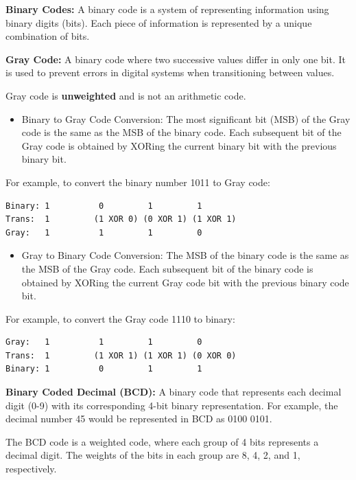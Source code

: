 \documentclass[11pt,a4paper]{article}
\providecommand{\tightlist}{\setlength{\itemsep}{1pt}\setlength{\parskip}{0pt}}
\begin{document}
\textbf{Binary Codes:} A binary code is a system of representing
information using binary digits (bits). Each piece of information is
represented by a unique combination of bits.

\textbf{Gray Code:} A binary code where two successive values differ in
only one bit. It is used to prevent errors in digital systems when
transitioning between values.

Gray code is \textbf{unweighted} and is not an arithmetic code.

\begin{itemize}
\tightlist
\item
  Binary to Gray Code Conversion: The most significant bit (MSB) of the
  Gray code is the same as the MSB of the binary code. Each subsequent
  bit of the Gray code is obtained by XORing the current binary bit with
  the previous binary bit.
\end{itemize}

For example, to convert the binary number 1011 to Gray code:

\begin{verbatim}
Binary: 1          0         1         1
Trans:  1         (1 XOR 0) (0 XOR 1) (1 XOR 1)
Gray:   1          1         1         0
\end{verbatim}

\begin{itemize}
\tightlist
\item
  Gray to Binary Code Conversion: The MSB of the binary code is the same
  as the MSB of the Gray code. Each subsequent bit of the binary code is
  obtained by XORing the current Gray code bit with the previous binary
  code bit.
\end{itemize}

For example, to convert the Gray code 1110 to binary:

\begin{verbatim}
Gray:   1          1         1         0
Trans:  1         (1 XOR 1) (1 XOR 1) (0 XOR 0)
Binary: 1          0         1         1
\end{verbatim}

\textbf{Binary Coded Decimal (BCD):} A binary code that represents each
decimal digit (0-9) with its corresponding 4-bit binary representation.
For example, the decimal number 45 would be represented in BCD as 0100
0101.

The BCD code is a weighted code, where each group of 4 bits represents a
decimal digit. The weights of the bits in each group are 8, 4, 2, and 1,
respectively.
\end{document}
